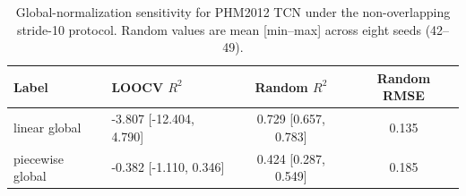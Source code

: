 \begin{table}[!ht]
\centering
\caption{Global-normalization sensitivity for PHM2012 TCN under the non-overlapping stride-10 protocol. Random values are mean [min--max] across eight seeds (42--49).}
\label{tab:global_normalization_nonoverlap}
\small
\begin{tabular}{llcc}
\toprule
Label & LOOCV $R^2$ & Random $R^2$ & Random RMSE \\
\midrule
linear global & -3.807 [-12.404, 4.790] & 0.729 [0.657, 0.783] & 0.135 \\
piecewise global & -0.382 [-1.110, 0.346] & 0.424 [0.287, 0.549] & 0.185 \\
\bottomrule
\end{tabular}
\end{table}
